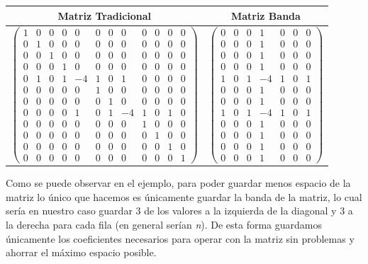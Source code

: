 \documentclass[10pt, a4paper]{article}
\begin{document}
\begin{table}[h]
\centering
\begin{tabular}{c | c 
}
Matriz Tradicional & Matriz Banda \\
\hline
$\begin{pmatrix}
1 & 0 & 0 & 0 & 0 &  0 &  0 & 0 & 0 & 0 & 0 & 0 \\
0 & 1 & 0 & 0 & 0 &  0 &  0 & 0 & 0 & 0 & 0 & 0 \\
0 & 0 & 1 & 0 & 0 &  0 &  0 & 0 & 0 & 0 & 0 & 0 \\
0 & 0 & 0 & 1 & 0 &  0 &  0 & 0 & 0 & 0 & 0 & 0 \\
0 & 1 & 0 & 1 & -4 & 1 & 0 & 1 & 0 & 0 & 0 & 0\\
0 & 0 & 0 & 0 & 0 & 1 & 0 & 0 & 0 & 0 & 0 & 0 \\
0 & 0 & 0 & 0 & 0 & 0 & 1 & 0 & 0 & 0 & 0 & 0\\
0 & 0 & 0 & 0 & 1 & 0 & 1 & -4 & 1 & 0 & 1 & 0 \\
0 & 0 & 0 & 0 & 0 &  0 &  0 & 0 & 1 & 0 & 0 & 0 \\
0 & 0 & 0 & 0 & 0 &  0 &  0 & 0 & 0 & 1 & 0 & 0 \\
0 & 0 & 0 & 0 & 0 &  0 &  0 & 0 & 0 & 0 & 1 & 0 \\
0 & 0 & 0 & 0 & 0 &  0 &  0 & 0 & 0 & 0 & 0 & 1
\end{pmatrix}$
&
$\begin{pmatrix}
0 & 0 & 0 & 1 & 0 & 0 & 0 \\
0 & 0 & 0 & 1 & 0 & 0 & 0 \\
0 & 0 & 0 & 1 & 0 & 0 & 0 \\
0 & 0 & 0 & 1 & 0 & 0 & 0 \\
1 & 0 & 1 & -4 & 1 & 0 & 1 \\
0 & 0 & 0 & 1 & 0 & 0 & 0 \\
0 & 0 & 0 & 1 & 0 & 0 & 0 \\
1 & 0 & 1 & -4 & 1 & 0 & 1 \\
0 & 0 & 0 & 1 & 0 & 0 & 0 \\
0 & 0 & 0 & 1 & 0 & 0 & 0 \\
0 & 0 & 0 & 1 & 0 & 0 & 0 \\
0 & 0 & 0 & 1 & 0 & 0 & 0
\end{pmatrix}$ \\
\end{tabular}
\end{table}

Como se puede observar en el ejemplo, para poder guardar menos espacio de la matriz lo \'unico que hacemos es \'unicamente guardar la banda de la matriz, lo cual ser\'ia en nuestro caso guardar 3 de los valores a la izquierda de la diagonal y 3 a la derecha para cada fila (en general ser\'ian \textit{n}). De esta forma guardamos \'unicamente los coeficientes necesarios para operar con la matriz sin problemas y ahorrar el m\'aximo espacio posible.
\end{document}
